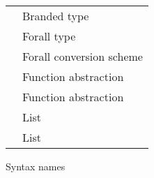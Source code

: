 \begin{figure}[p]
\caption{Syntax names}
\centering
\begin{tabular}{rl}

\csbrand{\varbrand}{\varty} & Branded type \\
\tyfor{\tyvar}{\varty} & Forall type \\
\csfor{\csvar}{\varcs} & Forall conversion scheme \\
\tyfun{\varty}{\varty} & Function abstraction \\
\csfun{\varcs}{\varcs} & Function abstraction \\
\tylist{\varty} & List \\
\cslist{\varcs} & List \\

\end{tabular}
\label{figsyntax2}
\end{figure}